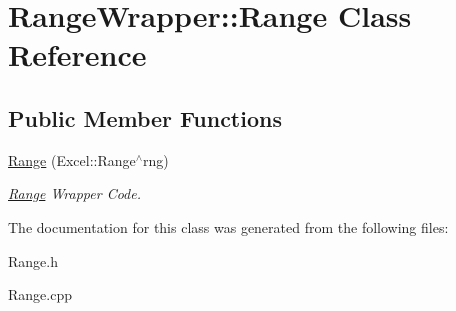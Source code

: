 \hypertarget{class_range_wrapper_1_1_range}{}\section{Range\+Wrapper\+:\+:Range Class Reference}
\label{class_range_wrapper_1_1_range}
\subsection*{Public Member Functions}
\begin{DoxyCompactItemize}
\item 
\hypertarget{class_range_wrapper_1_1_range_a1b115ae79c932c9af88cae890ce4ea9d}{}\hyperlink{class_range_wrapper_1_1_range_a1b115ae79c932c9af88cae890ce4ea9d}{Range} (Excel\+::\+Range$^\wedge$rng)\label{class_range_wrapper_1_1_range_a1b115ae79c932c9af88cae890ce4ea9d}

\begin{DoxyCompactList}\small\item\em \hyperlink{class_range_wrapper_1_1_range}{Range} Wrapper Code. \end{DoxyCompactList}\end{DoxyCompactItemize}


The documentation for this class was generated from the following files\+:\begin{DoxyCompactItemize}
\item 
Range.\+h\item 
Range.\+cpp\end{DoxyCompactItemize}
